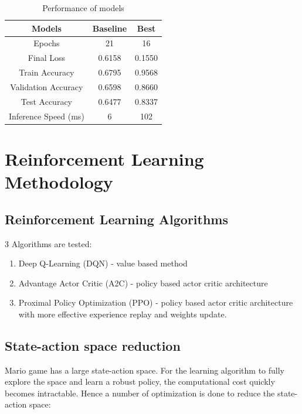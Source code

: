 \documentclass[conference]{IEEEtran}
\begin{document}
\begin{table}
    \centering
    \caption{Performance of models}
    \begin{tabular}{| c | c | c |}
        \toprule
        Models               & Baseline & Best   \\
        \midrule
        Epochs               & 21       & 16     \\
        \midrule
        Final Loss           & 0.6158   & 0.1550 \\
        \midrule
        Train Accuracy       & 0.6795   & 0.9568 \\
        \midrule
        Validation Accuracy  & 0.6598   & 0.8660 \\
        \midrule
        Test Accuracy        & 0.6477   & 0.8337 \\
        \midrule
        Inference Speed (ms) & 6        & 102    \\
        \bottomrule
    \end{tabular}
    \label{tab:final_model_accuracy}
\end{table}

\section{Reinforcement Learning Methodology}

\subsection{Reinforcement Learning Algorithms}

3 Algorithms are tested:

\begin{enumerate}
    \item Deep Q-Learning (DQN) - value based method
    \item Advantage Actor Critic (A2C) - policy based actor critic architecture
    \item Proximal Policy Optimization (PPO) - policy based actor critic architecture with more effective experience replay and weights update.
\end{enumerate}

\subsection{State-action space reduction}

Mario game has a large state-action space. For the learning algorithm to fully explore the space and learn a robust policy, the computational cost quickly becomes intractable. Hence a number of optimization is done to reduce the state-action space:
\end{document}
